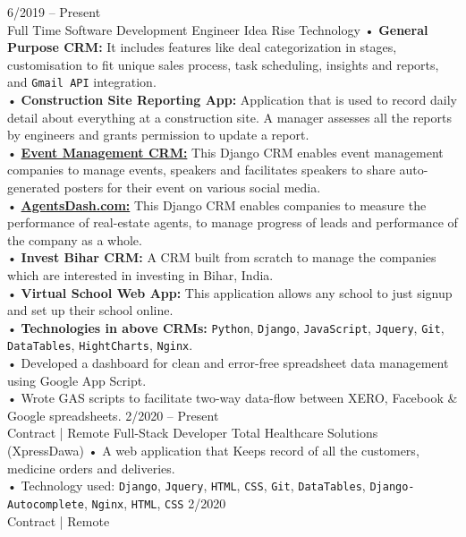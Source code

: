 \documentclass[8pt]{developercv} %
\begin{document}
\begin{entrylist}
	\entry
		{6/2019 -- Present\\\footnotesize{Full Time}}
		{Software Development Engineer}
		{Idea Rise Technology}
		{• \textbf{General Purpose CRM:} It includes features like deal categorization in stages, customisation to fit unique sales process, task scheduling, insights and reports, and \texttt{Gmail API} integration.\\• \textbf{Construction Site Reporting App:} Application that is used to record daily detail about everything at a construction site. A manager assesses all the reports by engineers and grants permission to update a report.\\• \href{https://eventage.pythonanywhere.com}{\textbf{Event Management CRM:}} This Django CRM enables event management companies to manage events, speakers and facilitates speakers to share auto-generated posters for their event on various social media. \\• \href{https://agentsdash.com}{\textbf{AgentsDash.com:}} This Django CRM enables companies to measure the performance of real-estate agents, to manage progress of leads and performance of the company as a whole. \\• \textbf{Invest Bihar CRM:} A CRM built from scratch to manage the companies which are interested in investing in Bihar, India. \\• \textbf{Virtual School Web App:} This application allows any school to just signup and set up their school online.\\• \textbf{Technologies in above CRMs:} \texttt{Python}, \texttt{Django}, \texttt{JavaScript}, \texttt{Jquery}, \texttt{Git}, \texttt{DataTables}, \texttt{HightCharts}, \texttt{Nginx}. \\ • Developed a dashboard for clean and error-free spreadsheet data management using Google App Script.\\ • Wrote GAS scripts to facilitate two-way data-flow between XERO, Facebook \& Google spreadsheets.}
	\entry
		{2/2020 -- Present \\\footnotesize{Contract | Remote}}
		{Full-Stack Developer}
		{Total Healthcare Solutions (XpressDawa)}
		{• A web application that Keeps record of all the customers, medicine orders and deliveries.\\• Technology used: \texttt{Django}, \texttt{Jquery}, \texttt{HTML}, \texttt{CSS}, \texttt{Git}, \texttt{DataTables}, \texttt{Django-Autocomplete}, \texttt{Nginx}, \texttt{HTML}, \texttt{CSS}}
	\entry
		{2/2020 \\\footnotesize{Contract | Remote}}

\end{entrylist}
\end{document}
